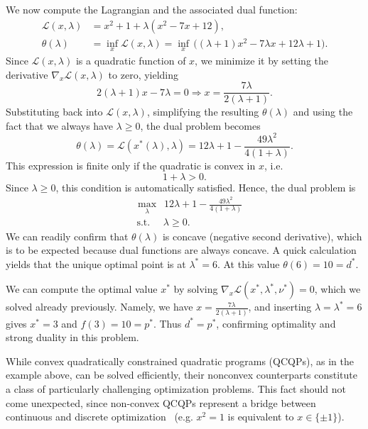 We now compute the Lagrangian and the associated dual function:
\begin{align*}
\mathcal{L}(x,\lambda) & = x^2 +1 +\lambda(x^2-7x+12), \\
\theta(\lambda) & = \inf _x \mathcal{L}(x,\lambda) = \inf_x \, \big((\lambda+1)x^2 -7\lambda x + 12 \lambda+1\big).
\end{align*}
Since $\mathcal{L}(x,\lambda)$ is a quadratic function of $x$, we minimize it by setting the derivative $\nabla_x \mathcal{L}(x,\lambda)$ to zero, yielding
$$
2(\lambda+1)x - 7\lambda = 0 \Longrightarrow x = \frac{7\lambda}{2(\lambda+1)}.
$$
Substituting back into $\mathcal{L}(x,\lambda)$, simplifying the resulting $\theta(\lambda)$ and using the fact that we always have $\lambda \ge 0$, the dual problem becomes 
$$\theta(\lambda)
= \mathcal{L}(x^*(\lambda),\lambda)
= 12\lambda + 1 - \frac{49\lambda^2}{4(1+\lambda)}.
$$
This expression is finite only if the quadratic is convex in $x$, i.e.
$$
1+\lambda > 0.
$$
Since $\lambda \ge 0$, this condition is automatically satisfied.
Hence, the dual problem is
\begin{align*}
  & \max_\lambda \,\,\, 12\lambda + 1 - \frac{49\lambda^2}{4(1+\lambda)} \\
  & \, \text{s.t.} \,\,\,\,\,\,\,\, \lambda \ge 0.
\end{align*}
We can readily confirm that $\theta(\lambda)$ is concave (negative second derivative), which is to be expected because dual functions are always concave.
A quick calculation yields that the unique optimal point is at $\lambda^* = 6$. At this value $\theta(6)=10 = d^*$.

We can compute the optimal value $x^*$ by solving
$\nabla_x \mathcal{L}(x^*,\lambda^*,\nu^*) = 0$, which we solved already previously. Namely, we have $x = \frac{7\lambda}{2(\lambda+1)}$, and inserting $\lambda=\lambda^*=6$ gives
$x^*=3$ and $f(3)=10=p^*$. Thus $d^{*}=p^{*}$, confirming optimality and strong duality in this problem.





\medskip
While convex quadratically constrained quadratic programs (QCQPs), as in the example above, can be solved efficiently, their nonconvex counterparts constitute a class of particularly challenging optimization problems.
This fact should not come unexpected, since non-convex QCQPs represent a bridge
between continuous and discrete optimization~\cite{calafiore2014optimization} (e.g. $x^2=1$ is equivalent to $x\in\{\pm1\}$).

